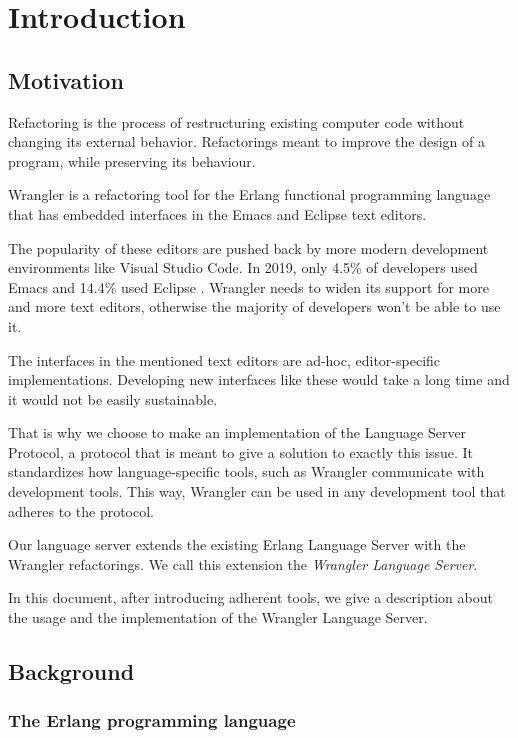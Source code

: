 \chapter{Introduction}
\label{ch:intro}

\section{Motivation}

Refactoring \cite{Refactoring} is the process of restructuring existing computer code without changing its external behavior. Refactorings meant to improve the design of a program, while preserving its behaviour.

Wrangler is a refactoring tool for the Erlang functional programming language that has embedded interfaces in the Emacs and Eclipse text editors.

The popularity of these editors are pushed back by more modern development environments like Visual Studio Code. In 2019, only 4.5\% of developers used Emacs and 14.4\% used Eclipse \cite{DevSurvey}. Wrangler needs to widen its support for more and more text editors, otherwise the majority of developers won’t be able to use it.

The interfaces in the mentioned text editors are ad-hoc, editor-specific implementations. 
Developing new interfaces like these would take a long time and it would not be easily sustainable. 

That is why we choose to make an implementation of the Language Server Protocol, a protocol that is meant to give a solution to exactly this issue. It standardizes how language-specific tools, such as Wrangler communicate with development tools. 
This way, Wrangler can be used in any development tool that adheres to the protocol.

Our language server extends the existing Erlang Language Server with the Wrangler refactorings. We call this extension the \emph{Wrangler Language Server}.

In this document, after introducing adherent tools, we give a description about the usage and the implementation of the Wrangler Language Server.

\section{Background}

\subsection{The Erlang programming language}

